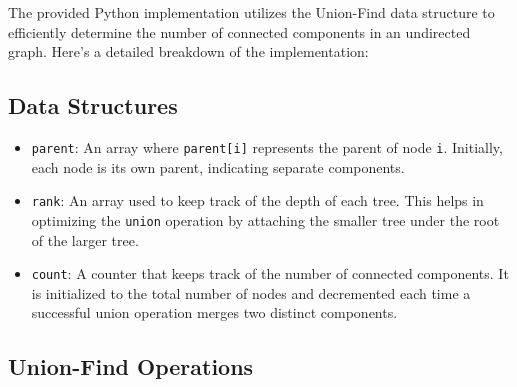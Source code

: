 The provided Python implementation utilizes the Union-Find data structure to efficiently determine the number of connected components in an undirected graph. Here's a detailed breakdown of the implementation:

\subsection*{Data Structures}

\begin{itemize}
    \item \texttt{parent}:  
    An array where \texttt{parent[i]} represents the parent of node \texttt{i}. Initially, each node is its own parent, indicating separate components.

    \item \texttt{rank}:  
    An array used to keep track of the depth of each tree. This helps in optimizing the \texttt{union} operation by attaching the smaller tree under the root of the larger tree.

    \item \texttt{count}:  
    A counter that keeps track of the number of connected components. It is initialized to the total number of nodes and decremented each time a successful union operation merges two distinct components.
\end{itemize}

\subsection*{Union-Find Operations}

